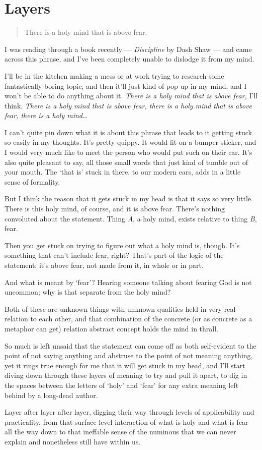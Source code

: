 \hypertarget{layers}{%
\section*{Layers}\label{layers}}

\begin{quote}
There is a holy mind that is above fear.
\end{quote}

I was reading through a book recently --- \emph{Discipline} by Dash Shaw --- and came across this phrase, and I've been completely unable to dislodge it from my mind.

I'll be in the kitchen making a mess or at work trying to research some fantastically boring topic, and then it'll just kind of pop up in my mind, and I won't be able to do anything about it. \emph{There is a holy mind that is above fear,} I'll think. \emph{There is a holy mind that is above fear, there is a holy mind that is above fear, there is a holy mind\ldots{}}

I can't quite pin down what it is about this phrase that leads to it getting stuck so easily in my thoughts. It's pretty quippy. It would fit on a bumper sticker, and I would very much like to meet the person who would put such on their car. It's also quite pleasant to say, all those small words that just kind of tumble out of your mouth. The `that is' stuck in there, to our modern ears, adds in a little sense of formality.

But I think the reason that it gets stuck in my head is that it says so very little. There is this holy mind, of course, and it is above fear. There's nothing convoluted about the statement. Thing \emph{A}, a holy mind, exists relative to thing \emph{B}, fear.

Then you get stuck on trying to figure out what a holy mind is, though. It's something that can't include fear, right? That's part of the logic of the statement: it's above fear, not made from it, in whole or in part.

And what is meant by `fear'? Hearing someone talking about fearing God is not uncommon; why is that separate from the holy mind?

Both of these are unknown things with unknown qualities held in very real relation to each other, and that combination of the concrete (or as concrete as a metaphor can get) relation abstract concept holds the mind in thrall.

So much is left unsaid that the statement can come off as both self-evident to the point of not saying anything and abstruse to the point of not meaning anything, yet it rings true enough for me that it will get stuck in my head, and I'll start diving down through these layers of meaning to try and pull it apart, to dig in the spaces between the letters of `holy' and `fear' for any extra meaning left behind by a long-dead author.

Layer after layer after layer, digging their way through levels of applicability and practicality, from that surface level interaction of what is holy and what is fear all the way down to that ineffable sense of the numinous that we can never explain and nonetheless still have within us.

